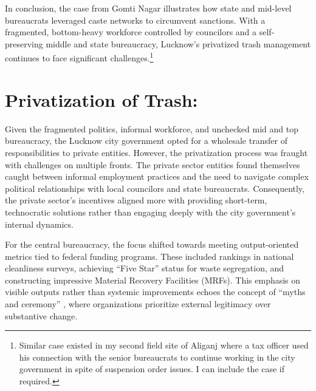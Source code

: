 In conclusion, the case from Gomti Nagar illustrates how state and mid-level bureaucrats leveraged caste networks to circumvent sanctions. With a fragmented, bottom-heavy workforce controlled by councilors and a self-preserving middle and state bureaucracy, Lucknow's privatized trash management continues to face significant challenges.\footnote{Similar case existed in my second field site of Aliganj where a tax officer used his connection with the senior bureaucrats to continue working in the city government in spite of suspension order issues. I can include the case if required.}

\section{Privatization of Trash:}

Given the fragmented politics, informal workforce, and unchecked mid and top bureaucracy, the Lucknow city government opted for a wholesale transfer of responsibilities to private entities. However, the privatization process was fraught with challenges on multiple fronts. The private sector entities found themselves caught between informal employment practices and the need to navigate complex political relationships with local councilors and state bureaucrats. Consequently, the private sector's incentives aligned more with providing short-term, technocratic solutions rather than engaging deeply with the city government's internal dynamics.

For the central bureaucracy, the focus shifted towards meeting output-oriented metrics tied to federal funding programs. These included rankings in national cleanliness surveys, achieving ``Five Star'' status for waste segregation, and constructing impressive Material Recovery Facilities (MRFs). This emphasis on visible outputs rather than systemic improvements echoes the concept of ``myths and ceremony'' \citep{Mayer1977}, where organizations prioritize external legitimacy over substantive change.

